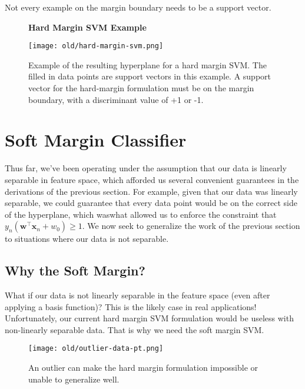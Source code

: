 \begin{warning}
    Not every example on the margin boundary needs to be a support vector.
\end{warning}

\begin{figure}
    \centering
    \textbf{Hard Margin SVM Example}\par\medskip
    \texttt{[image: old/hard-margin-svm.png]}
    \caption{Example of the resulting hyperplane for a hard margin SVM. The filled in data points are
      support vectors in this example. A support vector for the hard-margin formulation must be on the margin boundary, with a discriminant value of +1 or -1.}
    \label{fig:hard-margin-svm}
\end{figure}

\section{Soft Margin Classifier}

Thus far, we've been operating under the assumption that our data is linearly separable in feature space, which afforded us several convenient guarantees in the derivations of the previous section. For example, given that our data was linearly separable, we could guarantee that every data point would be on the correct side of the hyperplane, which waswhat allowed us to enforce the constraint that  $y_{n}(\textbf{w}^\top\textbf{x}_{n} + w_{0}) \geq  1$.
We now seek to generalize the work of the previous section to situations where our data is not
separable.

\subsection{Why the Soft Margin?}

What if our data is not linearly separable in the feature space (even after applying a basis function)?
This is the likely case in real applications!   Unfortunately, our current hard margin SVM formulation would be useless with non-linearly separable data. That is why we need the soft margin SVM.

\begin{figure}
    \centering
    \texttt{[image: old/outlier-data-pt.png]}
    \caption{An outlier can make the hard margin formulation impossible or unable to generalize well.}
    \label{fig:outlier-data-pt}
\end{figure}


